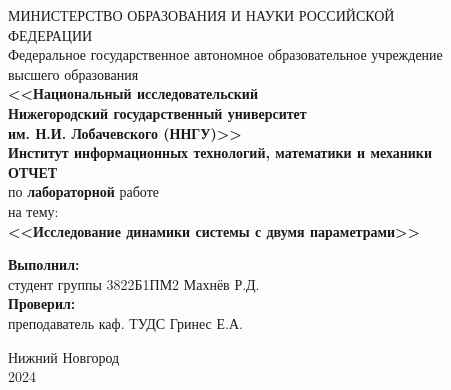 \begin{center} %
МИНИСТЕРСТВО ОБРАЗОВАНИЯ И НАУКИ РОССИЙСКОЙ \\
ФЕДЕРАЦИИ \\
Федеральное государственное автономное образовательное учреждение  \\
высшего образования\\ \textbf{<<Национальный исследовательский \\ Нижегородский государственный университет \\
им. Н.И. Лобачевского (ННГУ)>>}\\[1.5cm]%
\textbf{Институт информационных технологий, математики и механики}\\[5.5cm]

 \textbf{\large ОТЧЕТ} \\ %
 по \textbf{лабораторной} работе \\[0.6cm]
 
 на тему:\\
  \textbf{\large <<Исследование динамики системы с двумя параметрами>>}\\[6.5cm]
\begin{flushright}
 \begin{minipage}{0.52\textwidth} %
 \begin{flushleft} %
  \textbf{Выполнил:} \\
 студент группы 3822Б1ПМ2 Махнёв Р.Д. \\
  \textbf{Проверил:}\\
 преподаватель каф. ТУДС Гринес Е.А.\\
 \end{flushleft} %
 \end{minipage} %
\end{flushright}
 \vfill %

  Нижний Новгород \\
 2024

 \thispagestyle{empty} %

\end{center}